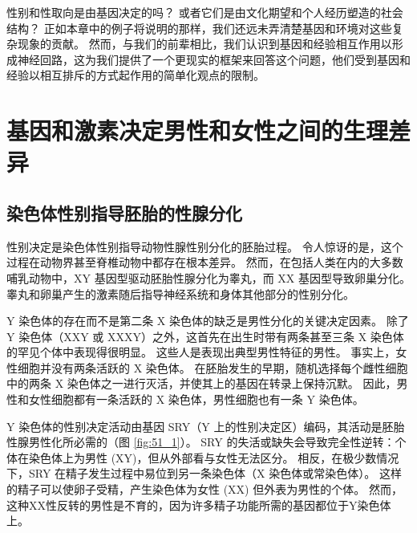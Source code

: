 性别和性取向是由基因决定的吗？ 或者它们是由文化期望和个人经历塑造的社会结构？ 正如本章中的例子将说明的那样，我们还远未弄清楚基因和环境对这些复杂现象的贡献。 然而，与我们的前辈相比，我们认识到基因和经验相互作用以形成神经回路，这为我们提供了一个更现实的框架来回答这个问题，他们受到基因和经验以相互排斥的方式起作用的简单化观点的限制。

\section{基因和激素决定男性和女性之间的生理差异}
\subsection{染色体性别指导胚胎的性腺分化}
性别决定是染色体性别指导动物性腺性别分化的胚胎过程。 令人惊讶的是，这个过程在动物界甚至脊椎动物中都存在根本差异。 然而，在包括人类在内的大多数哺乳动物中，XY 基因型驱动胚胎性腺分化为睾丸，而 XX 基因型导致卵巢分化。 睾丸和卵巢产生的激素随后指导神经系统和身体其他部分的性别分化。

Y 染色体的存在而不是第二条 X 染色体的缺乏是男性分化的关键决定因素。 除了 Y 染色体（XXY 或 XXXY）之外，这首先在出生时带有两条甚至三条 X 染色体的罕见个体中表现得很明显。 这些人是表现出典型男性特征的男性。 事实上，女性细胞并没有两条活跃的 X 染色体。 在胚胎发生的早期，随机选择每个雌性细胞中的两条 X 染色体之一进行灭活，并使其上的基因在转录上保持沉默。 因此，男性和女性细胞都有一条活跃的 X 染色体，男性细胞也有一条 Y 染色体。

Y 染色体的性别决定活动由基因 SRY（Y 上的性别决定区）编码，其活动是胚胎性腺男性化所必需的（图 \ref{fig:51_1}）。 
SRY 的失活或缺失会导致完全性逆转：个体在染色体上为男性 (XY)，但从外部看与女性无法区分。 相反，在极少数情况下，SRY 在精子发生过程中易位到另一条染色体（X 染色体或常染色体）。 这样的精子可以使卵子受精，产生染色体为女性 (XX) 但外表为男性的个体。 然而，这种XX性反转的男性是不育的，因为许多精子功能所需的基因都位于Y染色体上。

